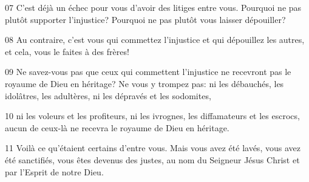 
07 C’est déjà un échec pour vous d’avoir des litiges entre vous. Pourquoi ne pas plutôt supporter l’injustice? Pourquoi ne pas plutôt vous laisser dépouiller?

08 Au contraire, c’est vous qui commettez l’injustice et qui dépouillez les autres, et cela, vous le faites à des frères!

09 Ne savez-vous pas que ceux qui commettent l’injustice ne recevront pas le royaume de Dieu en héritage? Ne vous y trompez pas: ni les débauchés, les idolâtres, les adultères, ni les dépravés et les sodomites,

10 ni les voleurs et les profiteurs, ni les ivrognes, les diffamateurs et les escrocs, aucun de ceux-là ne recevra le royaume de Dieu en héritage.

11 Voilà ce qu’étaient certains d’entre vous. Mais vous avez été lavés, vous avez été sanctifiés, vous êtes devenus des justes, au nom du Seigneur Jésus Christ et par l’Esprit de notre Dieu.
